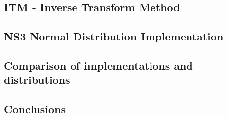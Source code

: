 \documentclass{article}
\begin{document}
  \subsection{ITM - Inverse Transform Method}
  \subsection{NS3 Normal Distribution Implementation}
  \subsection{Comparison of implementations and distributions}
  \subsection{Conclusions}
\end{document}
